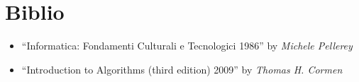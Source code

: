 \documentclass{article}
\begin{document}
\pagebreak



\pagebreak



\pagebreak

\section{Biblio}
\begin{itemize}
\item ``Informatica: Fondamenti Culturali e Tecnologici 1986'' by \textit{Michele Pellerey}
\item ``Introduction to Algorithms (third edition) 2009'' by \textit{Thomas H. Cormen}
\end{itemize}
\end{document}
